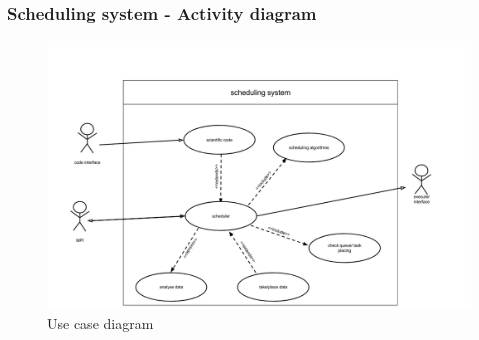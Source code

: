 \subsubsection{Scheduling system - Activity diagram}
	\begin{figure}[H]
		\includegraphics[width=1.5\textwidth,scale=0.75,trim=7cm 0 -7cm 0]{images/usecasediagram.png}
		\caption{Use case diagram}
	\end{figure}
